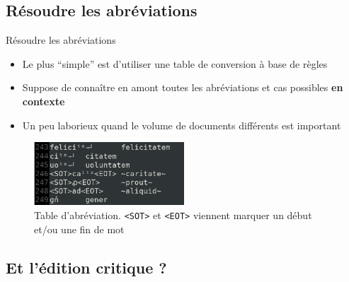 \documentclass[11pt,aspectratio=169]{beamer}
\begin{document}
\subsection{Résoudre les abréviations}
\begin{frame}{Résoudre les abréviations}
\begin{center}
\begin{itemize}
\item Le plus \enquote{simple} est d'utiliser une table de conversion à base de règles
\item Suppose de connaître en amont toutes les abréviations et cas possibles \textbf{en contexte}
\item Un peu laborieux quand le volume de documents différents est important
\end{itemize}
\begin{figure}
\includegraphics[width=0.5\textwidth]{img/table_abreviation.png}
\caption{Table d'abréviation. \texttt{<SOT>} et \texttt{<EOT>} viennent marquer un début et/ou une fin de mot}
\end{figure}
\end{center}
\end{frame}


\subsection{Et l'édition critique ?}
\end{document}
